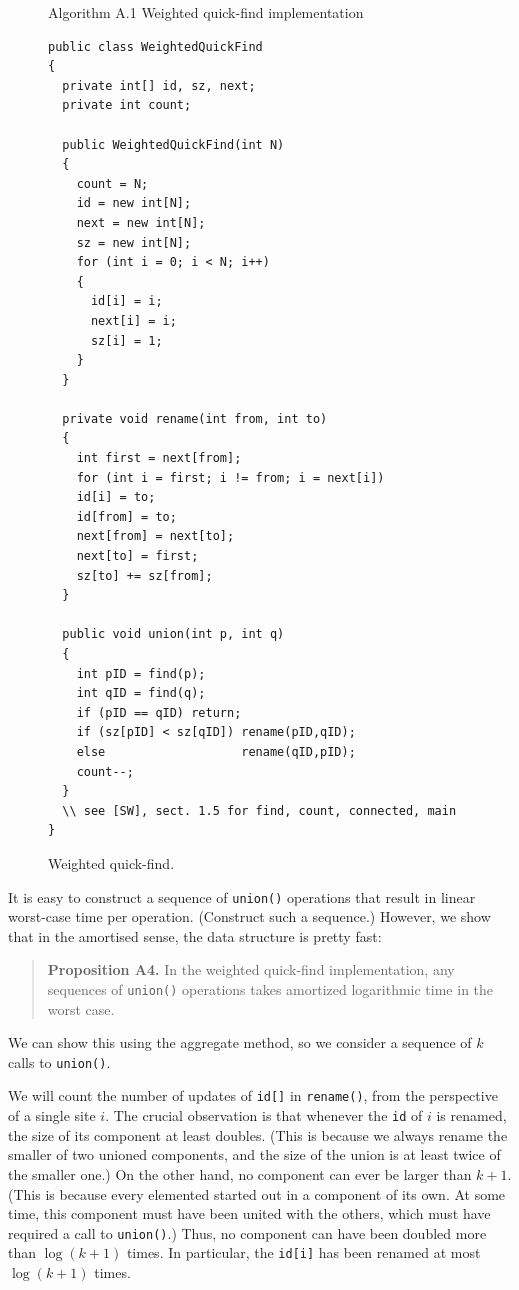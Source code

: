 \documentclass{tufte-handout}
\begin{document}
\begin{figure}

Algorithm A.1 Weighted quick-find implementation

\small
\begin{lstlisting}[basicstyle=\ttfamily,backgroundcolor=\color{white},
  frame=single,rulecolor=\color{gray!20},framesep=10pt, linewidth=12cm]
public class WeightedQuickFind
{
  private int[] id, sz, next;
  private int count;

  public WeightedQuickFind(int N)
  {
    count = N;
    id = new int[N];
    next = new int[N];
    sz = new int[N];
    for (int i = 0; i < N; i++) 
    { 
      id[i] = i;
      next[i] = i;
      sz[i] = 1;
    }
  }

  private void rename(int from, int to)
  {
    int first = next[from];
    for (int i = first; i != from; i = next[i])
	id[i] = to;
    id[from] = to;
    next[from] = next[to];
    next[to] = first;
    sz[to] += sz[from];
  }

  public void union(int p, int q) 
  {
    int pID = find(p); 
    int qID = find(q);
    if (pID == qID) return;
    if (sz[pID] < sz[qID]) rename(pID,qID);
    else                   rename(qID,pID);
    count--;
  }
  \\ see [SW], sect. 1.5 for find, count, connected, main
}
\end{lstlisting}
\caption{\label{fig: WUF impl}Weighted quick-find.}
\end{figure}

It is easy to construct a sequence of {\tt union()} operations that
result in linear worst-case time per operation. (Construct such a
sequence.) However, we show that in the amortised sense, the data
structure is pretty fast:

\begin{quote}
  {\bf Proposition A4.} In the weighted quick-find implementation, any
  sequences of {\tt union()} operations takes amortized logarithmic
  time in the worst case.
\end{quote}

We can show this using the aggregate method, so we consider a sequence
of $k$ calls to {\tt union()}.

We will count the number of updates of {\tt id[]} in {\tt rename()},
from the perspective of a single site $i$. 
The crucial observation is that whenever the {\tt id} of $i$ is
renamed, the size of its component at least doubles.
(This is because we always rename the smaller of two unioned
components, and the size of the union is at least twice of the smaller
one.)
On the other hand, no component can ever be larger than $k+1$. 
(This is because every elemented started out in a component of its
own.
At some time, this component must have been united with the others,
which must have required a call to {\tt union()}.)
Thus, no component can have been doubled more than $\log (k+1)$ times.
In particular, the {\tt id[i]} has been renamed at most $\log
(k+1)$ times.
\end{document}
